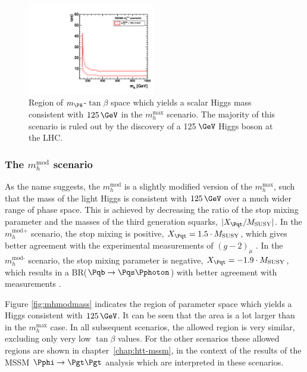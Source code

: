 \begin{figure}[htbp]
   \includegraphics[width=0.5\textwidth]{plots/theory/cmb_mhmax-HypoTest.pdf}
\caption[Region of $m_{\PA}$-$\tan\beta$ space which yields a scalar Higgs mass 
consistent with $125\,\GeV$ in the $m_{h}^{\text{max}}$ scenario.]
{Region of $m_{\PA}$-$\tan\beta$ space which yields a scalar Higgs mass 
consistent with $125\,\GeV$ in the $m_{h}^{\text{max}}$ scenario. The majority of
this scenario is ruled out by the discovery of a 125$\,\GeV$ Higgs boson at the
LHC.}
\label{fig:mhmaxmass}
\end{figure}

\subsubsection{The $m_{h}^{\text{mod}}$ scenario}
\label{sec:mhmodscenario}

As the name suggests, the $m_{h}^{\text{mod}}$ is a slightly modified version of
the $m_{h}^{\text{max}}$, such that the mass of the light Higgs is consistent
with $125\,\GeV$ over a much wider range of phase space. This is achieved by
decreasing the ratio of the stop mixing parameter and the masses of the third
generation squarks, $|X_{\Pqt}/M_{\text{SUSY}}|$. In the $m_{h}^{\text{mod+}}$
scenario, the stop mixing is positive, $X_{\Pqt} = 1.5 \cdot M_{\text{SUSY}}$,
which gives better agreement with the experimental measurements of $(g-2)_{\mu}$
\cite{Miller:2007kk}. In the $m_{h}^{\text{mod-}}$ scenario, the stop mixing parameter is
negative, $X_{\Pqt} = -1.9 \cdot M_{\text{SUSY}}$, which results in a
BR($\Pqb\to\Pqs\Pphoton$) with better agreement with measurements
\cite{Lees:2012wg}.

Figure \ref{fig:mhmodmass} indicates the region of parameter space which yields
a Higgs consistent with $125\,\GeV$. It can be seen that the area is a lot larger
than in the $m_{h}^{\text{max}}$ case. In all subsequent scenarios, the allowed
region is very similar, excluding only very low $\tan\beta$ values. For the
other scenarios these allowed regions are shown in chapter~\ref{chap:htt-mssm},
in the context of the results of the \ac{MSSM} $\Pphi \to \Pgt\Pgt$ analysis which
are interpreted in these scenarios.

